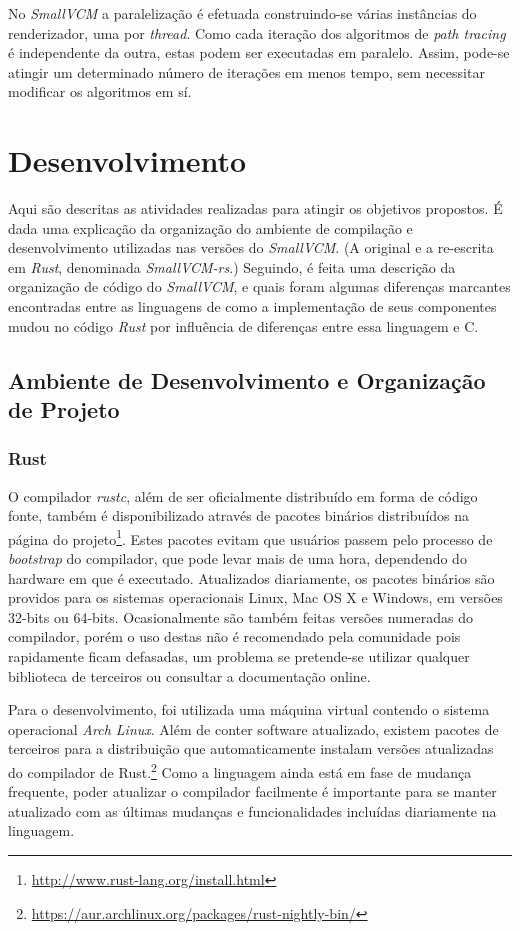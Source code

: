 \documentclass[tg]{mdtufsm}
\def\Cpp{{C\nolinebreak[4]\raisebox{.20ex}{\small\bf++}}}
\begin{document}
No \emph{SmallVCM} a paralelização é efetuada construindo-se várias instâncias do renderizador, uma por \emph{thread}. Como cada iteração dos algoritmos de \emph{path tracing} é independente da outra, estas podem ser executadas em paralelo. Assim, pode-se atingir um determinado número de iterações em menos tempo, sem necessitar modificar os algoritmos em sí.

\chapter{Desenvolvimento}

Aqui são descritas as atividades realizadas para atingir os objetivos propostos. É dada uma explicação da organização do ambiente de compilação e desenvolvimento utilizadas nas versões do \emph{SmallVCM}. (A original e a re-escrita em \emph{Rust}, denominada \emph{SmallVCM-rs}.) Seguindo, é feita uma descrição da organização de código do \emph{SmallVCM}, e quais foram algumas diferenças marcantes encontradas entre as linguagens de como a implementação de seus componentes mudou no código \emph{Rust} por influência de diferenças entre essa linguagem e \Cpp.

\section{Ambiente de Desenvolvimento e Organização de Projeto}

\subsection{Rust}

O compilador \emph{rustc}, além de ser oficialmente distribuído em forma de código fonte, também é disponibilizado através de pacotes binários distribuídos na página do projeto\footnote{\url{http://www.rust-lang.org/install.html}}. Estes pacotes evitam que usuários passem pelo processo de \emph{bootstrap} do compilador, que pode levar mais de uma hora, dependendo do hardware em que é executado. Atualizados diariamente, os pacotes binários são providos para os sistemas operacionais Linux, Mac OS X e Windows, em versões 32-bits ou 64-bits. Ocasionalmente são também feitas versões numeradas do compilador, porém o uso destas não é recomendado pela comunidade pois rapidamente ficam defasadas, um problema se pretende-se utilizar qualquer biblioteca de terceiros ou consultar a documentação online.

Para o desenvolvimento, foi utilizada uma máquina virtual contendo o sistema operacional \emph{Arch Linux}. Além de conter software atualizado, existem pacotes de terceiros para a distribuição que automaticamente instalam versões atualizadas do compilador de Rust.\footnote{\url{https://aur.archlinux.org/packages/rust-nightly-bin/}} Como a linguagem ainda está em fase de mudança frequente, poder atualizar o compilador facilmente é importante para se manter atualizado com as últimas mudanças e funcionalidades incluídas diariamente na linguagem.
\end{document}
